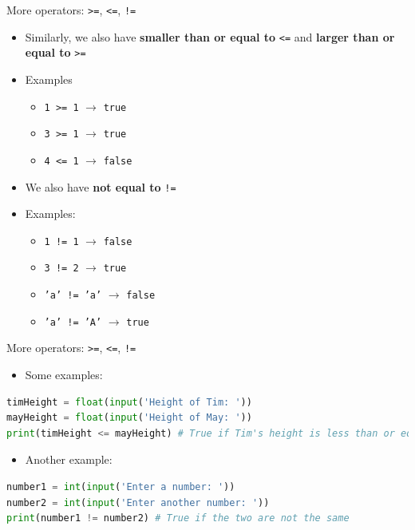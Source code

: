 \documentclass[10pt,xcolor={table,dvipsnames},t]{beamer}
\begin{document}
\begin{frame}{More operators: \texttt{>=}, \texttt{<=}, \texttt{!=}}
  \begin{itemize}
    \item Similarly, we also have \textbf{smaller than or equal to} \texttt{<=} and \textbf{larger than or equal to} \texttt{>=}
    \item Examples
    \begin{itemize}
      \item \texttt{1 >= 1} $\rightarrow$ \texttt{true}
      \item \texttt{3 >= 1} $\rightarrow$ \texttt{true}
      \item \texttt{4 <= 1} $\rightarrow$ \texttt{false}
    \end{itemize}
    \item We also have \textbf{not equal to} \texttt{!=}
    \item  Examples:
    \begin{itemize}
      \item  \texttt{1 != 1} $\rightarrow$ \texttt{false}
      \item  \texttt{3 != 2} $\rightarrow$ \texttt{true}
      \item  \texttt{'a' != 'a'} $\rightarrow$ \texttt{false}
      \item  \texttt{'a' != 'A'} $\rightarrow$ \texttt{true}
    \end{itemize}
  \end{itemize}
\end{frame}
\begin{frame}[fragile]{More operators: \texttt{>=}, \texttt{<=}, \texttt{!=}}
\begin{itemize}
  \item Some examples:
\end{itemize}
\begin{lstlisting}[language=python]
timHeight = float(input('Height of Tim: '))
mayHeight = float(input('Height of May: '))
print(timHeight <= mayHeight) # True if Tim's height is less than or equal to May's
\end{lstlisting}
\begin{itemize}
  \item Another example:
\end{itemize}
\begin{lstlisting}[language=python]
number1 = int(input('Enter a number: '))
number2 = int(input('Enter another number: '))
print(number1 != number2) # True if the two are not the same  
\end{lstlisting}
\end{frame}
\end{document}
